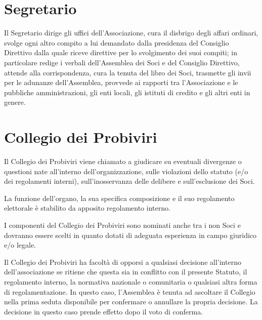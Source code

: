 \documentclass[legalpaper, 11pt]{exam}
\let\tempone\enumerate
\let\temptwo\endenumerate
\renewenvironment{enumerate}{\tempone\addtolength{\itemsep}{-0.45\baselineskip}}{\temptwo}
\begin{document}
{\section{Segretario}
\begin{enumerate}
 \item Il Segretario dirige gli uffici dell’Associazione, cura il disbrigo degli affari ordinari, svolge ogni altro compito a lui demandato dalla presidenza del Consiglio Direttivo dalla quale riceve direttive per lo svolgimento dei suoi compiti; in particolare redige i verbali dell’Assemblea dei Soci e del Consiglio Direttivo, attende alla corrispondenza, cura la tenuta del libro dei Soci, trasmette gli invii per le adunanze dell’Assemblea, provvede ai rapporti tra l’Associazione e le pubbliche amministrazioni, gli enti locali, gli istituti di credito e gli altri enti in genere.
\end{enumerate}

\section{Collegio dei Probiviri}
\begin{enumerate}
 \item Il Collegio dei Probiviri viene chiamato a giudicare su eventuali divergenze o questioni nate all’interno dell’organizzazione, sulle violazioni dello statuto (e/o dei regolamenti interni), sull’inosservanza delle delibere e sull’esclusione dei Soci.
 \item La funzione dell’organo, la sua specifica composizione e il suo regolamento elettorale è stabilito da apposito regolamento interno.
 \item I componenti del Collegio dei Probiviri sono nominati anche tra i non Soci e dovranno essere scelti in quanto dotati di adeguata esperienza in campo giuridico e/o legale.
 \item Il Collegio dei Probiviri ha facoltà di opporsi a qualsiasi decisione all'interno dell'associazione se ritiene che questa sia in conflitto con il presente Statuto, il regolamento interno, la normativa nazionale o comunitaria o qualsiasi altra forma di regolamentazione. In questo caso, l'Assemblea è tenuta ad ascoltare il Collegio nella prima seduta disponibile per confermare o annullare la propria decisione. La decisione in questo caso prende effetto dopo il voto di conferma.
\end{enumerate}

}
\end{document}
